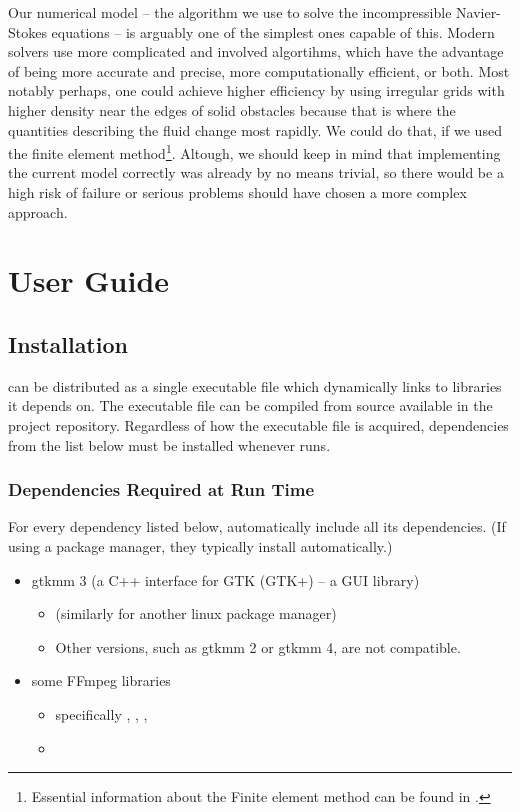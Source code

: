 \documentclass[11pt,a4paper,twoside,openright]{report}
\begin{document}
Our numerical model -- the algorithm we use to solve the incompressible Navier-Stokes equations -- is arguably one of the simplest ones capable of this. Modern solvers use more complicated and involved algortihms, which have the advantage of being more accurate and precise, more computationally efficient, or both. Most notably perhaps, one could achieve higher efficiency by using irregular grids with higher density near the edges of solid obstacles because that is where the quantities describing the fluid change most rapidly. We could do that, if we used the finite element method\footnote{Essential information about the Finite element method can be found in \cite{WikiFEM}.}. Altough, we should keep in mind that implementing the current model correctly was already by no means trivial, so there would be a high risk of failure or serious problems should  have chosen a more complex approach.


\chapter{User Guide}

\section{Installation}

\pname{} can be distributed as a single executable file which dynamically links to libraries it depends on. The executable file can be compiled from source available in the project repository. Regardless of how the executable file is acquired, dependencies from the list below must be installed whenever \pname{} runs.

\subsection{Dependencies Required at Run Time}\label{sec:runtimedeps}
For every dependency listed below, automatically include all its dependencies. (If using a package manager, they typically install automatically.)
\begin{itemize}
	\item gtkmm 3 (a C++ interface for GTK (GTK+) -- a GUI library)
		\begin{itemize}
			\item \pubinst{} (similarly for another linux package manager)
			\item Other versions, such as gtkmm 2 or gtkmm 4, are not compatible.
		\end{itemize}
	\item some FFmpeg libraries
		\begin{itemize}
			\item specifically , , , 
			\item \pubinst
		\end{itemize}
\end{itemize}
\end{document}
